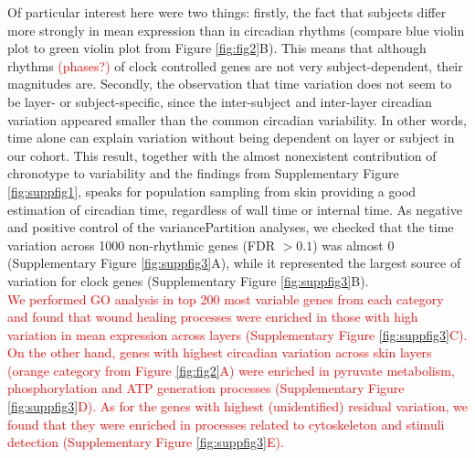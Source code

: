 Of particular interest here were two things: firstly, the fact that subjects differ more strongly in mean expression than in circadian rhythms (compare blue violin plot to green violin plot from Figure \ref{fig:fig2}B). This means that although rhythms \textcolor{red}{(phases?)} of clock controlled genes are not very subject-dependent, their magnitudes are. Secondly, the observation that time variation does not seem to be layer- or subject-specific, since the inter-subject and inter-layer circadian variation appeared smaller than the common circadian variability. In other words, time alone can explain variation without being dependent on layer or subject in our cohort. This result, together with the almost nonexistent contribution of chronotype to variability and the findings from Supplementary Figure \ref{fig:suppfig1}, speaks for population sampling from skin providing a good estimation of circadian time, regardless of wall time or internal time. As negative and positive control of the variancePartition analyses, we checked that the time variation across 1000 non-rhythmic genes (FDR $>0.1$) was almost 0 (Supplementary Figure \ref{fig:suppfig3}A), while it represented the largest source of variation for clock genes (Supplementary Figure \ref{fig:suppfig3}B).\\ %

\textcolor{red}{We performed \textcolor{red}{GO analysis in top 200 most variable genes from each category} and found that wound healing processes were enriched in those with high variation in mean expression across layers (\textcolor{red}{Supplementary Figure \ref{fig:suppfig3}C}). On the other hand, genes with highest circadian variation across skin layers (orange category from Figure \ref{fig:fig2}A) were enriched in pyruvate metabolism, phosphorylation and ATP generation processes (Supplementary Figure \ref{fig:suppfig3}D). As for the genes with highest (unidentified) residual variation, we found that they were enriched in processes related to cytoskeleton and stimuli detection (\textcolor{red}{Supplementary Figure \ref{fig:suppfig3}E}).\\}

